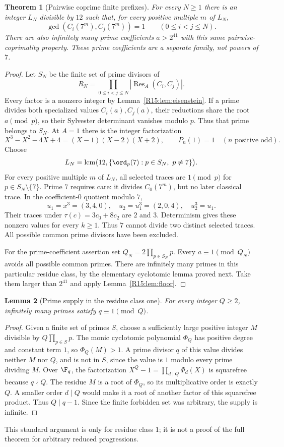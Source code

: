 \documentclass[11pt,a4paper]{article}
\newtheorem{theorem}{Theorem}[section]
\newtheorem{lemma}[theorem]{Lemma}\newtheorem{proposition}[theorem]{Proposition}
\theoremstyle{definition}\newtheorem{definition}[theorem]{Definition}
\theoremstyle{remark}\newtheorem{remark}[theorem]{Remark}
\DeclareMathOperator{\lcm}{lcm}\DeclareMathOperator{\disc}{disc}\DeclareMathOperator{\Res}{Res}
\begin{document}
\begin{theorem}[Pairwise coprime finite prefixes]\label{R15:thm:horizon}
For every $N\ge1$ there is an integer $L_N$ divisible by $12$
such that, for every positive multiple $m$ of $L_N$,
\[
 \gcd(C_i(7^m),C_j(7^m))=1\qquad(0\le i<j\le N).
\]
There are also infinitely many prime coefficients $a>2^{41}$ with
this same pairwise-coprimality property. These prime coefficients
are a separate family, not powers of $7$.
\end{theorem}
\begin{proof}
Let $S_N$ be the finite set of prime divisors of
\[
 R_N=\prod_{0\le i<j\le N}|\Res_A(C_i,C_j)|.
\]
Every factor is a nonzero integer by Lemma~\ref{R15:lem:eisenstein}.
If a prime divides both specialized values $C_i(a),C_j(a)$,
their reductions share the root $a\pmod p$, so their Sylvester
determinant vanishes modulo $p$. Thus that prime belongs to $S_N$.
At $A=1$ there is the integer factorization
\[
 X^3-X^2-4X+4=(X-1)(X-2)(X+2),
 \qquad P_n(1)=1\quad(n\text{ positive odd}).
\]
Choose
\[
 L_N=\lcm\bigl(12,\{\ord_p(7):p\in S_N,\ p\ne7\}\bigr).
\]
For every positive multiple $m$ of $L_N$, all selected traces are $1\pmod p$
for $p\in S_N\setminus\{7\}$.
Prime $7$ requires care: it divides $C_0(7^m)$, but no later
classical trace. In the coefficient-$0$ quotient modulo $7$,
\[
 u_1=x^3=(3,4,0),\quad u_2=u_1^3=(2,0,4),\quad u_2^3=u_1.
\]
Their traces under $\tau(c)=3c_0+8c_2$ are $2$ and $3$.
Determinism gives these nonzero values for every $k\ge1$.
Thus $7$ cannot divide two distinct selected traces. All possible
common prime divisors have been excluded.

For the prime-coefficient assertion set $Q_N=2\prod_{p\in S_N}p$.
Every $a\equiv1\pmod{Q_N}$ avoids all possible common primes.
There are infinitely many primes in this particular residue class,
by the elementary cyclotomic lemma proved next. Take them larger
than $2^{41}$ and apply Lemma~\ref{R15:lem:floor}.
\end{proof}

\begin{lemma}[Prime supply in the residue class one]\label{R15:lem:cyclotomic}
For every integer $Q\ge2$, infinitely many primes satisfy
$q\equiv1\pmod Q$.
\end{lemma}
\begin{proof}
Given a finite set of primes $S$, choose a sufficiently large positive
integer $M$ divisible by $Q\prod_{p\in S}p$. The monic cyclotomic
polynomial $\Phi_Q$ has positive degree and constant term $1$,
so $\Phi_Q(M)>1$. A prime divisor $q$ of this value divides
neither $M$ nor $Q$, and is not in $S$, since the value is $1$
modulo every prime dividing $M$.
Over $\F_q$, the factorization
$X^Q-1=\prod_{d\mid Q}\Phi_d(X)$ is squarefree because $q\nmid Q$.
The residue $M$ is a root of $\Phi_Q$, so its multiplicative order
is exactly $Q$. A smaller order $d\mid Q$ would make it a root
of another factor of this squarefree product. Thus $Q\mid q-1$.
Since the finite forbidden set was arbitrary, the supply is infinite.
\end{proof}
This standard argument is only for residue class $1$; it is not a
proof of the full theorem for arbitrary reduced progressions.
\end{document}
